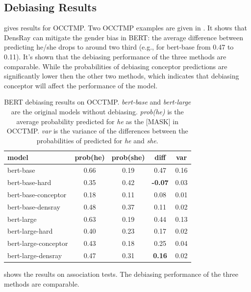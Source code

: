 
\subsection{Debiasing Results}
 gives results for OCCTMP. Two OCCTMP
examples are given in . It shows that
DensRay can mitigate the gender bias in BERT: the average
difference between predicting he/she drops to around two
third (e.g., for bert-base from 0.47 to 0.11). It's shown that the debiasing performance of the three methods are comparable. While the probabilities of debiasing conceptor predictions are significantly lower then the other two methods, which indicates that debiasing conceptor will affect the performance of the model.

\begin{table}[ht]
\centering
\footnotesize
\begin{tabular}{lcccc}
\hline
model & prob(he) & prob(she) & diff & var\\
\hline
bert-base & 0.66 & 0.19 & 0.47 &0.16\\
bert-base-hard & 0.35 & 0.42 & \textbf{-0.07}  &0.03\\
bert-base-conceptor & 0.18 & 0.11 & 0.08 & 0.01\\
bert-base-densray & 0.48 & 0.37 & {0.11} &0.02\\
\hline
bert-large  & 0.63 & 0.19 & 0.44  &0.13\\
bert-large-hard & 0.40 & 0.23 & 0.17  &0.02\\
bert-large-conceptor & 0.43 & 0.18 & 0.25 & 0.04\\
bert-large-densray  & 0.47 & 0.31 & \textbf{0.16} &0.02 \\
\hline
\end{tabular}
\caption{ BERT debiasing results on
  OCCTMP. \textit{bert-base} and \textit{bert-large} are the
  original models without debiasing. \textit{prob(he)} is
  the average probability  predicted for \textit{he} as
  the [MASK] in OCCTMP. \textit{var} is the variance of the
  differences between the probabilities of  predicted
  for \textit{he} and \textit{she}.}
\end{table}

 shows the results on association tests. The debiasing performance of the three methods are comparable.

